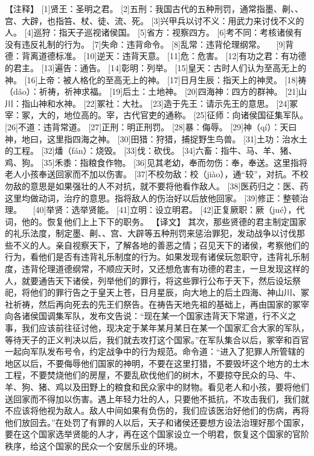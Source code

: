 \documentclass[a4paper,12pt,UTF8,twoside]{ctexbook}
\begin{document}
【注释】
[1]贤王：圣明之君。
[2]五刑：我国古代的五种刑罚，通常指墨、劓、、宫、大辟，也指笞、杖、徒、流、死。
[3]兴甲兵以讨不义：用武力来讨伐不义的人。
[4]巡狩：指天子巡视诸侯国。
[5]省方：视察四方。
[6]考不同：考核诸侯有没有违反礼制的行为。
[7]失命：违背命令。
[8]乱常：违背伦理纲常。
　[9]背德：背离道德标准。
[10]逆天：违背天意。
[11]危：危害。
[12]有功之君：有功德的君主。
[13]遍告：通告。
[14]彰明：列举。
[15]皇天：古时人们认为至高无上的神。
[16]上帝：被人格化的至高无上的神。
[17]日月生辰：指天上的神灵。
[18]祷（dǎo）：祈祷，祈神求福。
[19]后土：土地神。
[20]四海神：四方的群神。
[21]山川：指山神和水神。
[22]冢社：大社。
[23]造于先王：请示先王的意思。
[24]冢宰：冢，大的，地位高的。宰，古代官吏的通称。
[25]征师：向诸侯国征集军队。
[26]不道：违背常道。
[27]正刑：明正刑罚。
[28]暴：侮辱。
[29]神（qí）：天曰神，地曰，这里指四海之神。
[30]田猎：狩猎，捕捉野生鸟兽。
[31]土功：治水土的工程。
[32]燔（fán）：烧毁。
[33]伐：砍伐。
[34]六畜：指牛、马、羊、猪、鸡、狗。
[35]禾黍：指粮食作物。
[36]见其老幼，奉而勿伤：奉，奉送。这里指将老人小孩奉送回家而不加以伤害。
[37]不校勿敌：校（jiào），通“较”，对抗。不校勿敌的意思是如果强壮的人不对抗，就不要将他看作敌人。
[38]医药归之：医、药这里均做动词，治疗的意思。指将敌人的伤治好以后放他回家。
[39]修正：整顿治理。
　[40]举贤：选举贤能。
[41]立明：设立明君。
[42]正复厥职：厥（jué），代词，他的。恢复他们上上下下的职务。
【译文】
其次，那些贤德的君主制定国家的礼乐法度，制定墨、劓、、宫、大辟等五种刑罚来惩治罪犯，发动战争以讨伐那些不义的人。亲自视察天下，了解各地的善恶之情；召见天下的诸侯，考察他们的行为，看他们是否有违背礼乐制度的行为。如果发现有诸侯玩忽职守，违背礼乐制度，违背伦理道德纲常，不顺应天时，又还想危害有功德的君主，一旦发现这样的人，就要通告天下诸侯，列举他们的罪行，将这些罪行公布于天下，然后设坛祭祀，将他们的罪行告之于皇天上苍，日月星辰，向大地上的后土四海、神山川、冢社祈祷，然后再向死去的先王们祭告。在祷告天地先祖的基础上，再由国家的冢宰向各诸侯国调集军队，发布文告说：“现在某一个国家违背天下常道，行不义之事，我们应该前往征讨他，现决定于某年某月某日在某一个国家汇合大家的军队，等待天子的正义判决以后，我们就去攻打这个国家。”在军队集合以后，冢宰和百官一起向军队发布号令，约定战争中的行为规范。命令道：“进入了犯罪人所管辖的地区以后，不要侮辱他们国家的神明，不要在这里打猎，不要毁坏这个地方的土木工程，不要焚烧他们的房屋，不要乱砍伐他们的树木，不要掠夺民众的马、牛、羊、狗、猪、鸡以及田野上的粮食和民众家中的财物。看见老人和小孩，要将他们送回家而不得加以伤害。遇上年轻力壮的人，只要他不抵抗，不攻击我们，我们就不应该将他视为敌人。敌人中间如果有负伤的，我们应该医治好他们的伤病，再将他们放回去。”在处罚了有罪的人以后，天子和诸侯还要想方设法治理好那个国家，要在这个国家选举贤能的人才，再在这个国家设立一个明君，恢复这个国家的官阶秩序，给这个国家的民众一个安居乐业的环境。
\end{document}
